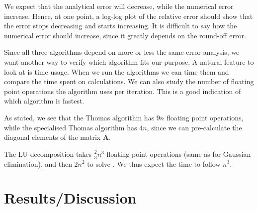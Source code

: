 \documentclass{emulateapj}
\begin{document}
        We expect that the analytical error will decrease, while the numerical error increase. Hence, at one point, a log-log plot of the relative error should show that the error stops decreasing and starts increasing. It is difficult to say how the numerical error should increase, since it greatly depends on the round-off error.
        \newline
        
        Since all three algorithms depend on more or less the same error analysis, we want another way to verify which algorithm fits our purpose. A natural feature to look at is time usage. When we run the algorithms we can time them and compare the time spent on calculations. We can also study the number of floating point operations the algorithm uses per iteration. This is a good indication of which algorithm is fastest. 
        
        As stated, we see that the Thomas algorithm has \(9n\) floating point operations, while the specialised Thomas algorithm has \(4n\), since we can pre-calculate the diagonal elements of the matrix \(\textbf{A}\).
        
        The LU decomposition takes \(\frac{2}{3}n^{3}\) floating point operations (same as for Gaussian elimination), and then \(2n^{2}\) to solve \cite[Chapter 2]{linalg}. We thus expect the time to follow \(n^{3}\).
        
\section{Results/Discussion}
\end{document}
